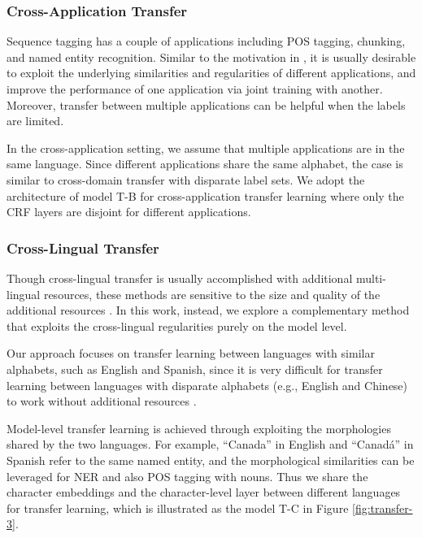 \documentclass{article} \usepackage{iclr2017_conference,times}
\begin{document}
\subsubsection{Cross-Application Transfer}

Sequence tagging has a couple of applications including POS tagging, chunking, and named entity recognition. Similar to the motivation in \citep{collobert2011natural}, it is usually desirable to exploit the underlying similarities and regularities of different applications, and improve the performance of one application via joint training with another. Moreover, transfer between multiple applications can be helpful when the labels are limited.

In the cross-application setting, we assume that multiple applications are in the same language. Since different applications share the same alphabet, the case is similar to cross-domain transfer with disparate label sets. We adopt the architecture of model T-B for cross-application transfer learning where only the CRF layers are disjoint for different applications.

\subsubsection{Cross-Lingual Transfer}

Though cross-lingual transfer is usually accomplished with additional multi-lingual resources, these methods are sensitive to the size and quality of the additional resources \citep{yarowsky2001inducing,wang2013cross}. In this work, instead, we explore a complementary method that exploits the cross-lingual regularities purely on the model level.

Our approach focuses on transfer learning between languages with similar alphabets, such as English and Spanish, since it is very difficult for transfer learning between languages with disparate alphabets (e.g., English and Chinese) to work without additional resources \citep{zirikly2cross}.

Model-level transfer learning is achieved through exploiting the morphologies shared by the two languages. For example, ``Canada'' in English and ``Canad\'{a}'' in Spanish refer to the same named entity, and the morphological similarities can be leveraged for NER and also POS tagging with nouns. Thus we share the character embeddings and the character-level layer between different languages for transfer learning, which is illustrated as the model T-C in Figure \ref{fig:transfer-3}.
\end{document}
